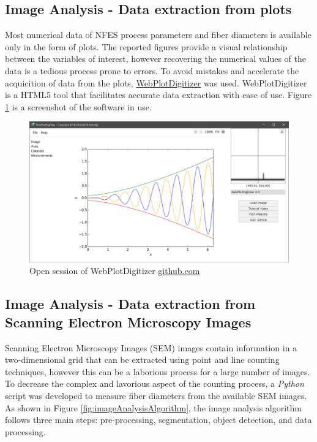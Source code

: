 \subsection{Image Analysis - Data extraction from plots}

Most numerical data of NFES process parameters and fiber diameters is available only in the form of plots. The reported figures provide a visual relationship between the variables of interest, however recovering the numerical values of the data is a tedious process prone to errors. To avoid mistakes and accelerate the acquicition of data from the plots, \href{https://github.com/ankitrohatgi/WebPlotDigitizer}{WebPlotDigitizer} was used. WebPlotDigitizer is a HTML5 tool that facilitates accurate data extraction with ease of use. Figure \ref{fig:screenshotWebPlotDigitizer} is a screenshot of the software in use.

\begin{figure}[!th]
\centering
\includegraphics[scale=0.45]{./Figures/screenshotWebPlotDigitizer.png}
\decoRule
\caption[WebPlotDigitizer home-screen]{Open session of WebPlotDigitizer \href{https://github.com/ankitrohatgi/WebPlotDigitizer}{github.com}}
\label{fig:screenshotWebPlotDigitizer}
\end{figure}

\subsection{Image Analysis - Data extraction from Scanning Electron Microscopy Images}

Scanning Electron Microscopy Images (SEM) images contain information in a two-dimensional grid that can be extracted using point and line counting techniques, however this can be a laborious process for a large number of images. To decrease the complex and lavorious aspect of the counting process, a \emph{Python} script was developed to measure fiber diameters from the available SEM images. As shown in Figure \ref{fig:imageAnalysisAlgorithm}, the image analysis algorithm follows three main steps: pre-processing, segmentation, object detection, and data processing.

